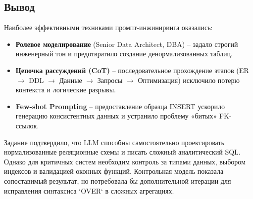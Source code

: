 \subsection{Вывод}
Наиболее эффективными техниками промпт-инжиниринга оказались:
\begin{itemize}
\item \textbf{Ролевое моделирование} (Senior Data Architect, DBA) – задало строгий инженерный тон и предотвратило создание денормализованных таблиц.
\item \textbf{Цепочка рассуждений (CoT)} – последовательное прохождение этапов (ER $\rightarrow$ DDL $\rightarrow$ Данные $\rightarrow$ Запросы $\rightarrow$ Оптимизация) исключило потерю контекста и логические разрывы.
\item \textbf{Few-shot Prompting} – предоставление образца INSERT ускорило генерацию консистентных данных и устранило проблему «битых» FK-ссылок.
\end{itemize}
Задание подтвердило, что LLM способны самостоятельно проектировать нормализованные реляционные схемы и писать сложный аналитический SQL. Однако для критичных систем необходим контроль за типами данных, выбором индексов и валидацией оконных функций. Контрольная модель показала сопоставимый результат, но потребовала бы дополнительной итерации для исправления синтаксиса `OVER` в сложных агрегациях.